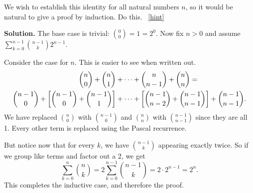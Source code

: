 \documentclass{book}
\begin{document}
\setcounter{project}{77}
\addtocounter{project}{-1}
\begin{activity}[]\label{activity-70}
\hypertarget{p-610}{}%
We wish to establish this identity for all natural numbers \(n\), so it would be natural to give a proof by induction.  Do this.%
~\hfill{\tiny\hyperlink{a-77}{[hint]}\hypertarget{q-77}{}}\par\smallskip%
\noindent\textbf{Solution.}\hypertarget{solution-59}{}\quad%
\hypertarget{p-612}{}%
The base case is trivial: \(\binom{0}{0} = 1 = 2^0\).  Now fix \(n \gt 0\) and assume \(\sum_{k=0}^{n-1} \binom{n-1}{k} 2^{n-1}\).%
\par
\hypertarget{p-613}{}%
Consider the case for \(n\).  This is easier to see when written out.%
\begin{align*}
\binom{n}{0} + \binom{n}{1} & + \cdots + \binom{n}{n-1}  + \binom{n}{n} = \\
\binom{n-1}{0} + \left[\binom{n-1}{0} + \binom{n-1}{1}\right] & + \cdots + \left[\binom{n-1}{n-2} + \binom{n-1}{n-1}\right] + \binom{n-1}{n-1}.
\end{align*}
We have replaced \(\binom{n}{0}\) with \(\binom{n-1}{0}\) and \(\binom{n}{n}\) with \(\binom{n-1}{n-1}\) since they are all 1.  Every other term is replaced using the Pascal recurrence.%
\par
\hypertarget{p-614}{}%
But notice now that for every \(k\), we have \(\binom{n-1}{k}\) appearing exactly twice.  So if we group like terms and factor out a 2, we get%
\begin{equation*}
\sum_{k=0}^n \binom{n}{k} = 2 \sum_{k=0}^{n-1} \binom{n-1}{k} = 2 \cdot 2^{n-1} = 2^n.
\end{equation*}
This completes the inductive case, and therefore the proof.%
\end{activity}
\end{document}
